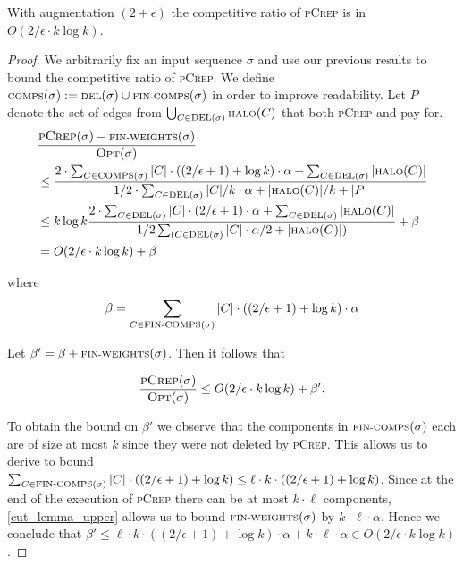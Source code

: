 \documentclass[a4paper,UKenglish,cleveref, autoref, thm-restate,authorcolumns]{lipics-v2019}
\newcommand{\adjDel}{\textsc{pCrep}}
\newcommand{\del}{\text{\scriptsize DEL}}
\newcommand{\opt}{\text{O{\scriptsize PT}}}
\newcommand{\halo}{\text{\scriptsize HALO}}
\newcommand{\finalComps}{\text{\scriptsize FIN-COMPS}}
\newcommand{\finalWeights}{\text{\scriptsize FIN-WEIGHTS}}
\newcommand{\comps}{\text{\scriptsize COMPS}}
\begin{document}
\begin{theorem}
	\label{comp_ratio_theo}
	With augmentation $(2+\epsilon)$ the competitive ratio of \adjDel{} is in $O(2/\epsilon\cdot k \log k)$.
\end{theorem}

\begin{proof}
	We arbitrarily fix an input sequence $\sigma$ and use our previous results to bound the competitive ratio of \adjDel{}. We define $\comps(\sigma):=\del{}(\sigma)\cup\finalComps(\sigma)$ in order to improve readability. Let $P$ denote the set of edges from $\bigcup_{C\in\del{}(\sigma)}\halo{}(C)$ that both \adjDel{} and \opt{} pay for.
	\begingroup
	\addtolength{\jot}{1em}
	\begin{align*}
	&\frac{\adjDel{}(\sigma)-\finalWeights(\sigma)}{\opt(\sigma)}\\ 
	&\leq\frac{2\cdot\sum_{C\in\comps(\sigma)}|C|\cdot((2/\epsilon+1)+\log k)\cdot\alpha +\sum_{C\in\del{}(\sigma)} |\halo(C)|}{1/2\cdot\sum_{C\in\del{}(\sigma)}|C|/k\cdot\alpha+|\halo(C)|/k +|P|}\\
	&\leq k \log k\frac{2\cdot\sum_{C\in\del(\sigma)}|C|\cdot(2/\epsilon+1) \cdot\alpha+\sum_{C\in\del{}(\sigma)}|\halo(C)|}{1/2\sum_{(C\in\del{}(\sigma)}|C|\cdot\alpha/2+|\halo(C)|)}+\beta\\
	& = O(2/\epsilon\cdot k \log k) +\beta
	\end{align*}
	\endgroup
	
	\noindent where
	\begin{align*}
	\beta=\sum_{C\in \finalComps(\sigma)}|C|\cdot((2/\epsilon+1)+\log k)\cdot\alpha
	\end{align*}
	
	\noindent Let $\beta'=\beta+\finalWeights(\sigma)$. Then it follows that
	
	\begin{align*}
	\frac{\adjDel{}(\sigma)}{\opt(\sigma)}\leq O(2/\epsilon\cdot k \log k) +\beta'.
	\end{align*}
	
	To obtain the bound on $\beta'$ we observe that the components in $\finalComps(\sigma)$ each are of size at most $k$ since they were not deleted by \adjDel{}. This allows us to derive to bound $\sum_{C\in \finalComps(\sigma)}|C|\cdot((2/\epsilon+1)+\log k)\leq \ell \cdot k \cdot ((2/\epsilon+1)+\log k)$. Since at the end of the execution of \adjDel{} there can be at most $k\cdot \ell$ components, \cref{cut_lemma_upper} allows us to bound $\finalWeights(\sigma)$ by $k\cdot \ell \cdot\alpha$. Hence we conclude that $\beta'\leq \ell\cdot k \cdot
	((2/\epsilon+1)+\log k)\cdot\alpha+k\cdot \ell\cdot \alpha\in O(2/\epsilon\cdot k \log k)$.
\end{proof}
\end{document}
